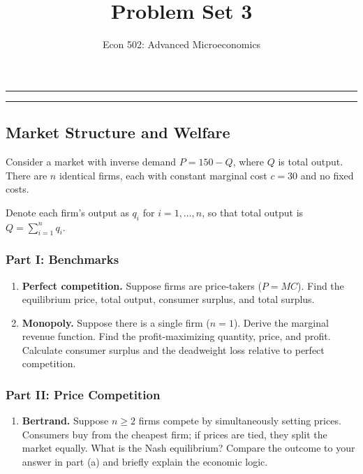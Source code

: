 \documentclass[
  11pt,
]{article}
\title{Problem Set 3}
\subtitle{Econ 502: Advanced Microeconomics}
\author{}
\date{}
\makeatletter
\providecommand{\tightlist}{%
  \setlength{\itemsep}{0pt}\setlength{\parskip}{0pt}}
\renewcommand{\maketitle}{%
  \thispagestyle{plain}
  \begin{center}
    {\color{csufblue}\rule{\textwidth}{1.5pt}}\par
    \vspace{10pt}
    {\LARGE\bfseries\color{csufnavy}\@title\par}
    \vspace{8pt}
    {\color{csufblue}\rule{\textwidth}{1.5pt}}
  \end{center}
  \vspace{12pt}
}
\makeatother
\begin{document}
\maketitle


\subsection{Market Structure and
Welfare}\label{market-structure-and-welfare}

Consider a market with inverse demand \(P = 150 - Q\), where \(Q\) is
total output. There are \(n\) identical firms, each with constant
marginal cost \(c = 30\) and no fixed costs.

Denote each firm's output as \(q_i\) for \(i = 1, \ldots, n\), so that
total output is \(Q = \sum_{i=1}^n q_i\).

\subsubsection{Part I: Benchmarks}\label{part-i-benchmarks}

\begin{enumerate}
\def\labelenumi{\alph{enumi})}
\item
  \textbf{Perfect competition.} Suppose firms are price-takers
  (\(P = MC\)). Find the equilibrium price, total output, consumer
  surplus, and total surplus.
\item
  \textbf{Monopoly.} Suppose there is a single firm (\(n = 1\)). Derive
  the marginal revenue function. Find the profit-maximizing quantity,
  price, and profit. Calculate consumer surplus and the deadweight loss
  relative to perfect competition.
\end{enumerate}

\subsubsection{Part II: Price
Competition}\label{part-ii-price-competition}

\begin{enumerate}
\def\labelenumi{\alph{enumi})}
\setcounter{enumi}{2}
\tightlist
\item
  \textbf{Bertrand.} Suppose \(n \geq 2\) firms compete by
  simultaneously setting prices. Consumers buy from the cheapest firm;
  if prices are tied, they split the market equally. What is the Nash
  equilibrium? Compare the outcome to your answer in part (a) and
  briefly explain the economic logic.
\end{enumerate}
\end{document}
